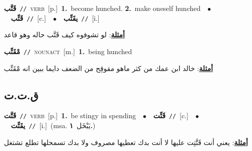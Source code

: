 \documentclass[10pt,a4paper,twoside]{article} %
\begin{document}
\begin{multicols}{2}
{\setlength\topsep{0pt}\textbf{\foreignlanguage{arabic}{قَتَّب}}\ {\color{gray}\texttt{//}\color{black}}\ \textsc{verb}\ [p.]\ \textbf{1.}~become hunched.  \textbf{2.}~make oneself hunched\ \ $\bullet$\ \ \setlength\topsep{0pt}\textbf{\foreignlanguage{arabic}{قَتِّب}}\ {\color{gray}\texttt{//}\color{black}}\ [c.]\ \ $\bullet$\ \ \setlength\topsep{0pt}\textbf{\foreignlanguage{arabic}{يقَتِّب}}\ {\color{gray}\texttt{//}\color{black}}\ [i.]\  \begin{flushright}\color{gray}\foreignlanguage{arabic}{\textbf{\underline{\foreignlanguage{arabic}{أمثلة}}}: لو تشوفوه كيف قَتَّب حاله وهو قاعد}\end{flushright}\color{black}} \vspace{2mm}

{\setlength\topsep{0pt}\textbf{\foreignlanguage{arabic}{مْقَتِّب}}\ {\color{gray}\texttt{//}\color{black}}\ \textsc{noun\textunderscore act}\ [m.]\ \textbf{1.}~being hunched\  \begin{flushright}\color{gray}\foreignlanguage{arabic}{\textbf{\underline{\foreignlanguage{arabic}{أمثلة}}}: خالد ابن عمك من كثر ماهو مقوقِح من الضعف دايما ببين انه مْقَتِّب}\end{flushright}\color{black}} \vspace{2mm}

\vspace{-3mm}
\subsection*{\color{blue}\foreignlanguage{arabic}{ق.ت.ت}\color{blue}{}} 

{\setlength\topsep{0pt}\textbf{\foreignlanguage{arabic}{قَتَّت}}\ {\color{gray}\texttt{//}\color{black}}\ \textsc{verb}\ [p.]\ \textbf{1.}~be stingy in spending\ \ $\bullet$\ \ \setlength\topsep{0pt}\textbf{\foreignlanguage{arabic}{قَتِّت}}\ {\color{gray}\texttt{//}\color{black}}\ [c.]\ \ $\bullet$\ \ \setlength\topsep{0pt}\textbf{\foreignlanguage{arabic}{يقَتِّت}}\ {\color{gray}\texttt{//}\color{black}}\ [i.]\ \color{gray}(msa. \foreignlanguage{arabic}{يَبْخَل}~\foreignlanguage{arabic}{\textbf{١.}})\color{black}\  \begin{flushright}\color{gray}\foreignlanguage{arabic}{\textbf{\underline{\foreignlanguage{arabic}{أمثلة}}}: يعني أنت قَتَّتِت عليها لا أنت بدك تعطيها مصروف ولا بدك تسمحلها تطلع تشتغل}\end{flushright}\color{black}} \vspace{2mm}


\end{multicols}
\end{document}

